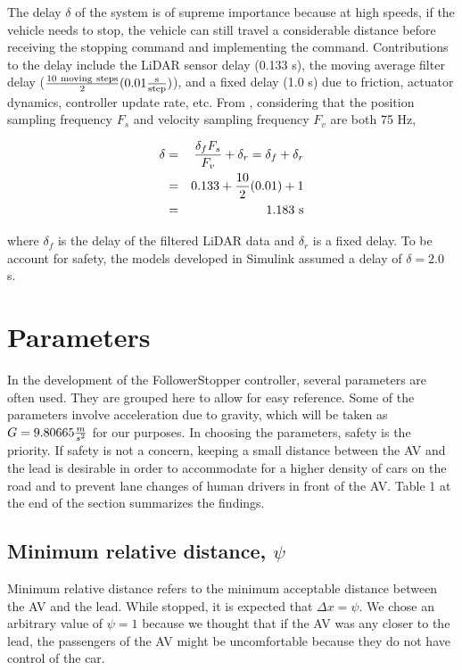 \documentclass[conference]{IEEEtran}
\begin{document}
\hspace{0.01 in}The delay $\delta$ of the system is of supreme importance because at high speeds, if the vehicle needs to stop, the vehicle can still travel a considerable distance before receiving the stopping command and implementing the command. Contributions to the delay include the LiDAR sensor delay (0.133 s), the moving average filter delay ($\rm {10\ moving\ steps\over 2}(0.01{s\over step})$), and a fixed delay (1.0 s) due to friction, actuator dynamics, controller update rate, etc. From \cite{Real-time}, considering that the position sampling frequency $F_s$ and velocity sampling frequency $F_v$ are both 75 Hz,

\begin{eqnarray*}
\delta &=& {\delta_f F_s \over F_v}+\delta_r = \delta_f +\delta_r \\
&=& 0.133+{10\over 2}(0.01)+1\\
&=& 1.183 \rm\ s
\end{eqnarray*}

where $\delta_f$ is the delay of the filtered LiDAR data and $\delta_r$ is a fixed delay. To be account for safety, the models developed in Simulink assumed a delay of $\delta = 2.0$ s.






\section{Parameters}
In the development of the FollowerStopper controller, several parameters are often used. They are grouped here to allow for easy reference. Some of the parameters involve acceleration due to gravity, which will be taken as $G=9.80665 {m\over s^2}$ for our purposes. In choosing the parameters, safety is the priority. If safety is not a concern, keeping a small distance between the AV and the lead is desirable in order to accommodate for a higher density of cars on the road and to prevent lane changes of human drivers in front of the AV. Table 1 at the end of the section summarizes the findings.
 
\subsection{Minimum relative distance, $\psi$}
Minimum relative distance refers to the minimum acceptable distance between the AV and the lead. While stopped, it is expected that $\Delta x= \psi$. We chose an arbitrary value of $\psi=1$ because we thought that if the AV was any closer to the lead, the passengers of the AV might be uncomfortable because they do not have control of the car. 
\end{document}
